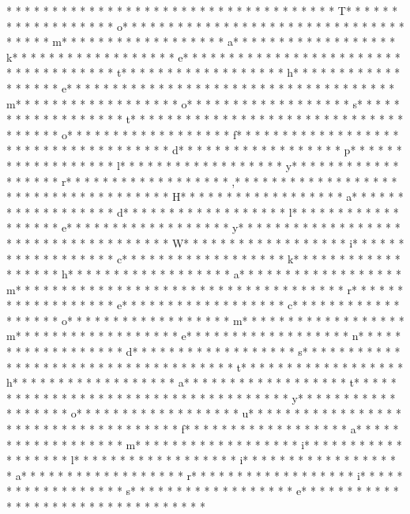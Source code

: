 * * *  * * *  * * *  *  * * *  *  * * *  * 	* * *  * * *  * * *  *  * * *  *  * * *  * T* * *  * * *  * * *  *  * * *  *  * * *  * o* * *  * * *  * * *  *  * * *  *  * * *  *  * * *  * * *  * * *  *  * * *  *  * * *  * m* * *  * * *  * * *  *  * * *  *  * * *  * a* * *  * * *  * * *  *  * * *  *  * * *  * k* * *  * * *  * * *  *  * * *  *  * * *  * e* * *  * * *  * * *  *  * * *  *  * * *  *  * * *  * * *  * * *  *  * * *  *  * * *  * t* * *  * * *  * * *  *  * * *  *  * * *  * h* * *  * * *  * * *  *  * * *  *  * * *  * e* * *  * * *  * * *  *  * * *  *  * * *  *  * * *  * * *  * * *  *  * * *  *  * * *  * m* * *  * * *  * * *  *  * * *  *  * * *  * o* * *  * * *  * * *  *  * * *  *  * * *  * s* * *  * * *  * * *  *  * * *  *  * * *  * t* * *  * * *  * * *  *  * * *  *  * * *  *  * * *  * * *  * * *  *  * * *  *  * * *  * o* * *  * * *  * * *  *  * * *  *  * * *  * f* * *  * * *  * * *  *  * * *  *  * * *  *  * * *  * * *  * * *  *  * * *  *  * * *  * d* * *  * * *  * * *  *  * * *  *  * * *  * p* * *  * * *  * * *  *  * * *  *  * * *  * l* * *  * * *  * * *  *  * * *  *  * * *  * y* * *  * * *  * * *  *  * * *  *  * * *  * r* * *  * * *  * * *  *  * * *  *  * * *  * ,* * *  * * *  * * *  *  * * *  *  * * *  *  * * *  * * *  * * *  *  * * *  *  * * *  * H* * *  * * *  * * *  *  * * *  *  * * *  * a* * *  * * *  * * *  *  * * *  *  * * *  * d* * *  * * *  * * *  *  * * *  *  * * *  * l* * *  * * *  * * *  *  * * *  *  * * *  * e* * *  * * *  * * *  *  * * *  *  * * *  * y* * *  * * *  * * *  *  * * *  *  * * *  *  * * *  * * *  * * *  *  * * *  *  * * *  * W* * *  * * *  * * *  *  * * *  *  * * *  * i* * *  * * *  * * *  *  * * *  *  * * *  * c* * *  * * *  * * *  *  * * *  *  * * *  * k* * *  * * *  * * *  *  * * *  *  * * *  * h* * *  * * *  * * *  *  * * *  *  * * *  * a* * *  * * *  * * *  *  * * *  *  * * *  * m* * *  * * *  * * *  *  * * *  *  * * *  *  * * *  * * *  * * *  *  * * *  *  * * *  * r* * *  * * *  * * *  *  * * *  *  * * *  * e* * *  * * *  * * *  *  * * *  *  * * *  * c* * *  * * *  * * *  *  * * *  *  * * *  * o* * *  * * *  * * *  *  * * *  *  * * *  * m* * *  * * *  * * *  *  * * *  *  * * *  * m* * *  * * *  * * *  *  * * *  *  * * *  * e* * *  * * *  * * *  *  * * *  *  * * *  * n* * *  * * *  * * *  *  * * *  *  * * *  * d* * *  * * *  * * *  *  * * *  *  * * *  * s* * *  * * *  * * *  *  * * *  *  * * *  *  * * *  * * *  * * *  *  * * *  *  * * *  * t* * *  * * *  * * *  *  * * *  *  * * *  * h* * *  * * *  * * *  *  * * *  *  * * *  * a* * *  * * *  * * *  *  * * *  *  * * *  * t* * *  * * *  * * *  *  * * *  *  * * *  *  * * *  * * *  * * *  *  * * *  *  * * *  * y* * *  * * *  * * *  *  * * *  *  * * *  * o* * *  * * *  * * *  *  * * *  *  * * *  * u* * *  * * *  * * *  *  * * *  *  * * *  *  * * *  * * *  * * *  *  * * *  *  * * *  * f* * *  * * *  * * *  *  * * *  *  * * *  * a* * *  * * *  * * *  *  * * *  *  * * *  * m* * *  * * *  * * *  *  * * *  *  * * *  * i* * *  * * *  * * *  *  * * *  *  * * *  * l* * *  * * *  * * *  *  * * *  *  * * *  * i* * *  * * *  * * *  *  * * *  *  * * *  * a* * *  * * *  * * *  *  * * *  *  * * *  * r* * *  * * *  * * *  *  * * *  *  * * *  * i* * *  * * *  * * *  *  * * *  *  * * *  * s* * *  * * *  * * *  *  * * *  *  * * *  * e* * *  * * *  * * *  *  * * *  *  * * *  *  * * *  * * *  * * *  *  * * *  *  * 